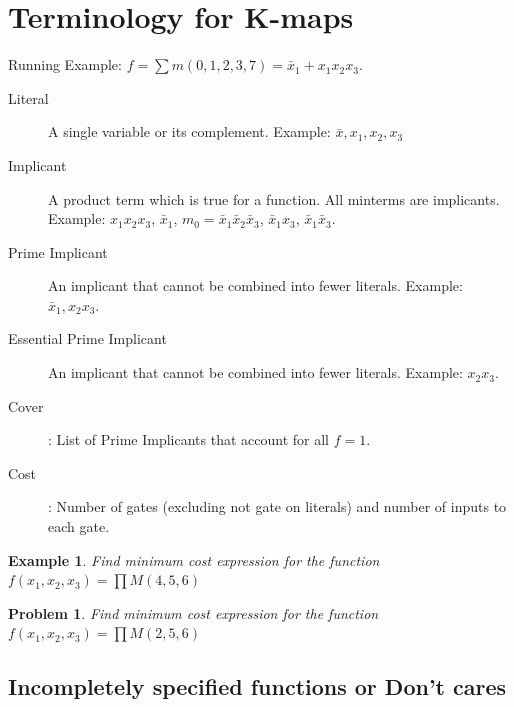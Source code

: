 \documentclass{article}
\newtheorem{example}{Example}
\newtheorem{prob}{Problem}
\newcommand{\bx}{\bar{x}}
\begin{document}
\section{Terminology for K-maps}
Running Example: $f = \sum m(0, 1, 2, 3, 7) = \bx_1 + x_1 x_2 x_3$.
\begin{description}
  \item[Literal] A single variable or its complement. Example: $\bx, x_1, x_2, x_3$
  \item[Implicant] A product term which is true for a function. All minterms are
    implicants. Example: $x_1
    x_2 x_3$, $\bx_1$, $m_0 = \bx_1\bx_2\bx_3$, $\bx_1 x_3$, $\bx_1 \bx_3$.
  \item [Prime Implicant] An implicant that cannot be combined into fewer
    literals. Example: $\bx_1, x_2x_3$.
  \item [Essential Prime Implicant] An implicant that cannot be combined into
    fewer literals. Example: $x_2x_3$.
  \item [Cover] : List of Prime Implicants that account for all $f = 1$.
  \item [Cost]: Number of gates (excluding not gate on literals) and number of
      inputs to each gate.
\end{description}

\begin{example}
  Find minimum cost expression for the function $f(x_1, x_2, x_3) = \prod M(4, 5, 6)$
\end{example}
\vspace{10em}

\begin{prob}
  Find minimum cost expression for the function $f(x_1, x_2, x_3) = \prod M(2, 5, 6)$
\end{prob}
\vspace{10em}

\subsection{Incompletely specified functions or Don't cares}
\end{document}
